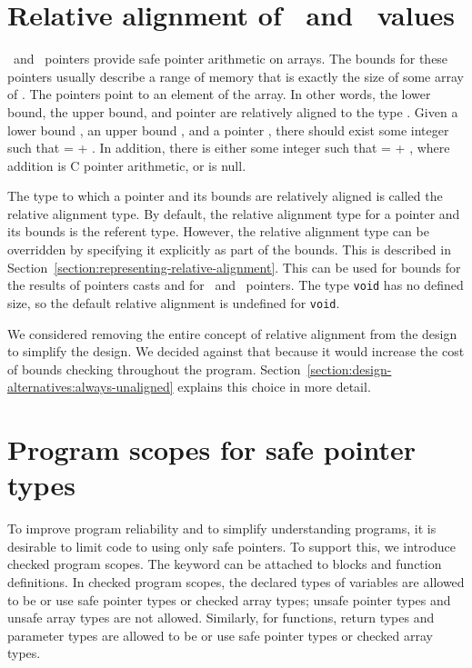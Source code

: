 \section{Relative alignment of \arrayptr\ and \arrayview\ values}
\label{section:relative-alignment}

\arrayptrT\ and \arrayviewT\ pointers provide safe
pointer arithmetic on arrays. The bounds for these pointers usually
describe a range of memory that is exactly the size of some array of .
The pointers point to an element of the array. In other words, the lower
bound, the upper bound, and pointer are  relatively aligned to the type
. Given a lower bound , an upper bound , and a
pointer , there should exist some integer  such that
 =  + . In addition, there is either some
integer  such that  =  + ,
where addition is C pointer arithmetic, or  is null.

The type to which a pointer and its bounds are relatively aligned is
called the relative alignment type. By default, the relative alignment
type for a pointer and its bounds is the referent type. However, the
relative alignment type can be overridden by specifying it explicitly as
part of the bounds.  This is described in 
Section~\ref{section:representing-relative-alignment}.
This can be used for bounds for the results of pointers casts and 
for  \arrayptrvoid\ and \arrayviewvoid\ pointers. The type
\texttt{void} has no defined size, so the default relative alignment is
undefined for \texttt{void}.

We considered removing the entire concept of relative alignment from the
design to simplify the design.  We decided against that because it would 
increase the cost of bounds checking throughout the program.  
Section~\ref{section:design-alternatives:always-unaligned} explains
this choice in more detail.

\section{Program scopes for safe pointer types}

To improve program reliability and to simplify understanding programs,
it is desirable to limit code to using only safe pointers. To support
this, we introduce checked program scopes. The  keyword
can be attached to blocks and function definitions. In checked program
scopes, the declared types of variables are allowed to be or use
safe pointer types or checked array types; unsafe pointer types
and unsafe array types are not allowed.  Similarly, for functions,
return types and parameter types are allowed to be or use safe pointer
types or checked array types.  

